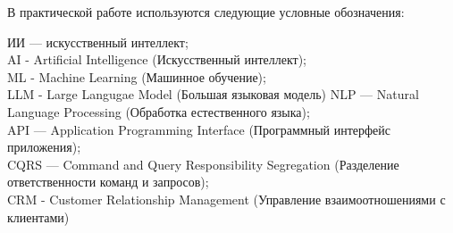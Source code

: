 \label{sec:reduction}

В практической работе используются следующие условные обозначения:

ИИ — искусственный интеллект;\\
AI - Artificial Intelligence (Искусственный интеллект);\\
ML - Machine Learning (Машинное обучение);\\
LLM - Large Langugae Model (Большая языковая модель)
NLP — Natural Language Processing (Обработка естественного языка);\\
API — Application Programming Interface (Программный интерфейс приложения);\\
CQRS — Command and Query Responsibility Segregation (Разделение ответственности команд и запросов);\\
CRM - Customer Relationship Management (Управление взаимоотношениями с клиентами)


